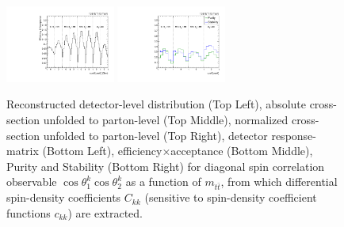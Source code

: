 \begin{figure}[htb]
\begin{center}
 \includegraphics[width=0.32\textwidth]{fig_fullRun2UL/unfolding/combined/TotEff_c_kk_mttbar.pdf}
 \includegraphics[width=0.32\textwidth]{fig_fullRun2UL/unfolding/combined/PurStab_c_kk_mttbar.pdf} \\
\caption{Reconstructed detector-level distribution (Top Left), absolute cross-section unfolded to parton-level (Top Middle), normalized cross-section unfolded to parton-level (Top Right), detector response-matrix (Bottom Left), efficiency$\times$acceptance (Bottom Middle), Purity and Stability (Bottom Right) for diagonal spin correlation observable $\cos\theta_{1}^{k}\cos\theta_{2}^{k}$ as a function of $m_{t\bar{t}}$, from which differential spin-density coefficients $C_{kk}$ (sensitive to spin-density coefficient functions $c_{k k}$) are extracted.}
\label{fig:c_kk_mttbar}
\end{center}
\end{figure}
\clearpage
